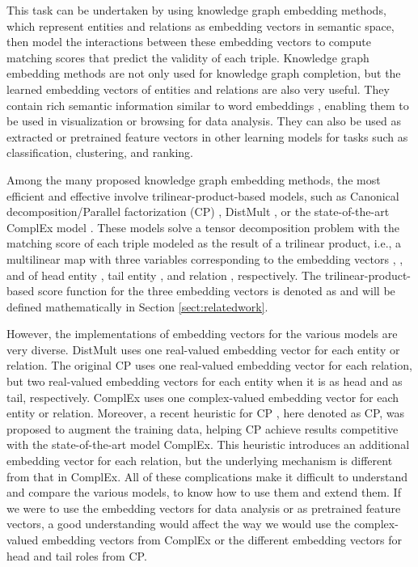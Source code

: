 \documentclass[sigconf,edbt]{acmart-edbt2019}
\begin{document}
This task can be undertaken by using knowledge graph embedding methods, which represent entities and relations as embedding vectors in semantic space, then model the interactions between these embedding vectors to compute matching scores that predict the validity of each triple. Knowledge graph embedding methods are not only used for knowledge graph completion, but the learned embedding vectors of entities and relations are also very useful. They contain rich semantic information similar to word embeddings \cite{mikolov_distributedrepresentationswords_2013} \cite{mikolov_efficientestimationword_2013} \cite{jeffreypennington_gloveglobalvectors_2014}, enabling them to be used in visualization or browsing for data analysis. They can also be used as extracted or pretrained feature vectors in other learning models for tasks such as classification, clustering, and ranking.

Among the many proposed knowledge graph embedding methods, the most efficient and effective involve trilinear-product-based models, such as Canonical decomposition/Parallel factorization (CP) \cite{hitchcock_expressiontensorpolyadic_1927} \cite{lacroix_canonicaltensordecomposition_2018}, DistMult \cite{yang_embeddingentitiesrelations_2015}, or the state-of-the-art ComplEx model \cite{trouillon_complexembeddingssimple_2016}. These models solve a tensor decomposition problem with the matching score of each triple modeled as the result of a trilinear product, i.e., a multilinear map with three variables corresponding to the embedding vectors , , and  of head entity , tail entity , and relation , respectively. The trilinear-product-based score function for the three embedding vectors is denoted as  and will be defined mathematically in Section \ref{sect:relatedwork}.
 
However, the implementations of embedding vectors for the various models are very diverse. DistMult \cite{yang_embeddingentitiesrelations_2015} uses one real-valued embedding vector for each entity or relation. The original CP \cite{hitchcock_expressiontensorpolyadic_1927} uses one real-valued embedding vector for each relation, but two real-valued embedding vectors for each entity when it is as head and as tail, respectively. ComplEx \cite{trouillon_complexembeddingssimple_2016} uses one complex-valued embedding vector for each entity or relation. Moreover, a recent heuristic for CP \cite{lacroix_canonicaltensordecomposition_2018}, here denoted as CP, was proposed to augment the training data, helping CP achieve results competitive with the state-of-the-art model ComplEx. This heuristic introduces an additional embedding vector for each relation, but the underlying mechanism is different from that in ComplEx. All of these complications make it difficult to understand and compare the various models, to know how to use them and extend them. If we were to use the embedding vectors for data analysis or as pretrained feature vectors, a good understanding would affect the way we would use the complex-valued embedding vectors from ComplEx or the different embedding vectors for head and tail roles from CP.
\end{document}
